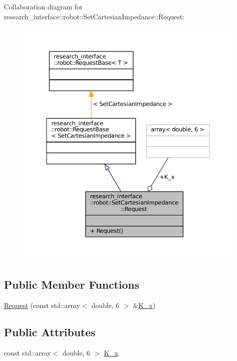 Collaboration diagram for research\+\_\+interface\+:\+:robot\+:\+:Set\+Cartesian\+Impedance\+:\+:Request\+:
\nopagebreak
\begin{figure}[H]
\begin{center}
\leavevmode
\includegraphics[width=350pt]{structresearch__interface_1_1robot_1_1SetCartesianImpedance_1_1Request__coll__graph}
\end{center}
\end{figure}
\subsection*{Public Member Functions}
\begin{DoxyCompactItemize}
\item 
\hyperlink{structresearch__interface_1_1robot_1_1SetCartesianImpedance_1_1Request_a3c23714fcea1da13049b8bf2285520f8}{Request} (const std\+::array$<$ double, 6 $>$ \&\hyperlink{structresearch__interface_1_1robot_1_1SetCartesianImpedance_1_1Request_a5256eedd5d81275b4fe4b78da92123ed}{K\+\_\+x})
\end{DoxyCompactItemize}
\subsection*{Public Attributes}
\begin{DoxyCompactItemize}
\item 
const std\+::array$<$ double, 6 $>$ \hyperlink{structresearch__interface_1_1robot_1_1SetCartesianImpedance_1_1Request_a5256eedd5d81275b4fe4b78da92123ed}{K\+\_\+x}
\end{DoxyCompactItemize}


